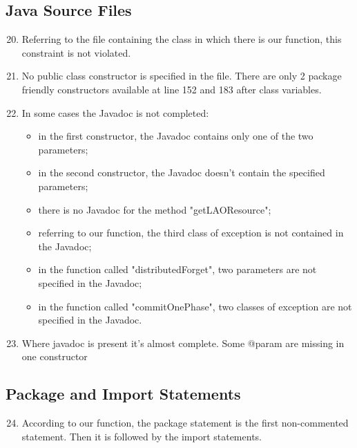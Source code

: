 \subsection{Java Source Files}
\begin{enumerate}
	\setcounter{enumi}{19}
	\item Referring to the file containing the class in which there is our function, this constraint is not violated.
	\item No public class constructor is specified in the file. There are only 2 package friendly constructors available at line 152 and 183 after class variables.
	\item In some cases the Javadoc is not completed:
	    \begin{itemize}
	        \item in the first constructor, the Javadoc contains only one of the two parameters;
	        \item in the second constructor, the Javadoc doesn't contain the specified parameters;
	        \item there is no Javadoc for the method "getLAOResource";
	        \item referring to our function, the third class of exception is not contained in the Javadoc;
	        \item in the function called "distributedForget", two parameters are not specified in the Javadoc;
	        \item in the function called "commitOnePhase", two classes of exception are not specified in the Javadoc.
	    \end{itemize}
	\item Where javadoc is present it's almost complete. Some @param are missing in one constructor
\end{enumerate}
\subsection{Package and Import Statements}
\begin{enumerate}
	\setcounter{enumi}{23}
	\item According to our function, the package statement is the first non-commented statement. Then it is followed by the import statements.
\end{enumerate}
